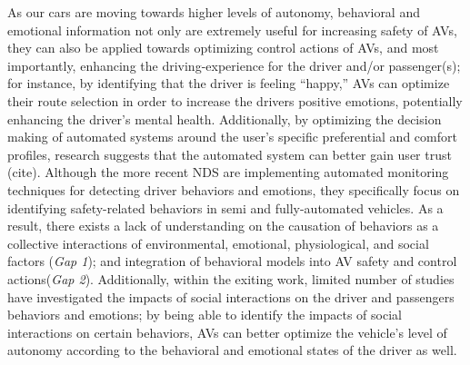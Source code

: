     As our cars are moving towards higher levels of autonomy, behavioral and emotional information not only are extremely useful for increasing safety of AVs, they can also be applied towards optimizing control actions of AVs, and most importantly, enhancing the  driving-experience for the driver and/or passenger(s); for instance, by identifying that the driver is feeling “happy,” AVs can optimize their route selection in order to increase the drivers positive emotions, potentially enhancing the driver's mental health. Additionally, by optimizing the decision making of automated systems around the user's specific preferential and comfort profiles, research suggests that the automated system can better gain user trust (cite). Although the more recent NDS are implementing automated monitoring techniques for detecting driver behaviors and emotions, they specifically focus on identifying safety-related behaviors in semi and fully-automated vehicles. As a result, there exists a lack of  understanding on the causation of behaviors as a collective interactions of environmental, emotional, physiological, and social factors (\textit{Gap 1}); and integration of behavioral models into AV safety and control actions(\textit{Gap 2}). Additionally, within the exiting work, limited number of studies have investigated the impacts of social interactions on the driver and passengers behaviors and emotions; by being able to identify the impacts of social interactions on certain behaviors, AVs can better optimize the vehicle's level of autonomy according to the behavioral and emotional states of the driver as well. 

  
